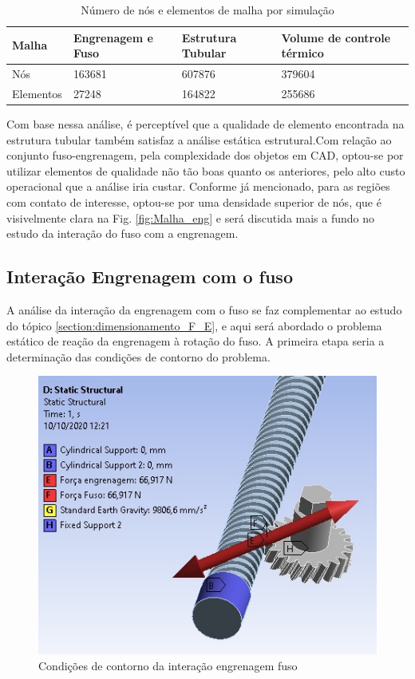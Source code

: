 \begin{table}[H]
     \centering
     \caption{Número de nós e elementos de malha por simulação}
    \centering
     \begin{tabular}{|C{3cm}|C{3cm}|C{4cm}|C{4cm}|}
       \hline
      \textbf{Malha} &
      \textbf{Engrenagem e Fuso} &
      \textbf{Estrutura Tubular} &
      \textbf{Volume de controle térmico} \\ \hline
        Nós & 163681 & 607876 & 379604 \\ \hline
         Elementos & 27248 & 164822 & 255686 \\ \hline
         
        \end{tabular}
     \label{tab:nos}
\end{table}

Com base nessa análise, é perceptível que a qualidade de elemento encontrada na estrutura tubular também satisfaz a análise estática estrutural.Com relação ao conjunto fuso-engrenagem, pela complexidade dos objetos em CAD, optou-se por utilizar elementos de qualidade não tão boas quanto os anteriores, pelo alto custo operacional que a análise iria custar. Conforme já mencionado, para as regiões com contato de interesse, optou-se por uma densidade superior de nós, que é visivelmente clara na Fig. \ref{fig:Malha_eng} e será discutida mais a fundo no estudo da interação do fuso com a engrenagem.


\subsection{Interação Engrenagem com o fuso}

A análise da interação da engrenagem com o fuso se faz complementar ao estudo do tópico \ref{section:dimensionamento_F_E}, e aqui será abordado o problema estático de reação da engrenagem à rotação do fuso. A primeira etapa seria a determinação das condições de contorno do problema.

\begin{figure}[ht]
        \centering
        \includegraphics[width=.5\textwidth]{figuras/estrutura/InteracaoFusoEng/Condicao de contorno.jpeg}
        \caption{Condições de contorno da interação engrenagem fuso}
        \label{fig:condcontorno}
    \end{figure}

